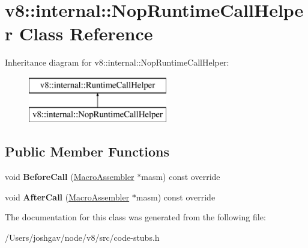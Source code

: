 \hypertarget{classv8_1_1internal_1_1_nop_runtime_call_helper}{}\section{v8\+:\+:internal\+:\+:Nop\+Runtime\+Call\+Helper Class Reference}
\label{classv8_1_1internal_1_1_nop_runtime_call_helper}
Inheritance diagram for v8\+:\+:internal\+:\+:Nop\+Runtime\+Call\+Helper\+:\begin{figure}[H]
\begin{center}
\leavevmode
\includegraphics[height=2.000000cm]{classv8_1_1internal_1_1_nop_runtime_call_helper}
\end{center}
\end{figure}
\subsection*{Public Member Functions}
\begin{DoxyCompactItemize}
\item 
void {\bfseries Before\+Call} (\hyperlink{classv8_1_1internal_1_1_macro_assembler}{Macro\+Assembler} $\ast$masm) const  override\hypertarget{classv8_1_1internal_1_1_nop_runtime_call_helper_a511718ffa851301c92f3d6ee75c1876e}{}\label{classv8_1_1internal_1_1_nop_runtime_call_helper_a511718ffa851301c92f3d6ee75c1876e}

\item 
void {\bfseries After\+Call} (\hyperlink{classv8_1_1internal_1_1_macro_assembler}{Macro\+Assembler} $\ast$masm) const  override\hypertarget{classv8_1_1internal_1_1_nop_runtime_call_helper_a891369566cf5093e12da500beaded72c}{}\label{classv8_1_1internal_1_1_nop_runtime_call_helper_a891369566cf5093e12da500beaded72c}

\end{DoxyCompactItemize}


The documentation for this class was generated from the following file\+:\begin{DoxyCompactItemize}
\item 
/\+Users/joshgav/node/v8/src/code-\/stubs.\+h\end{DoxyCompactItemize}
